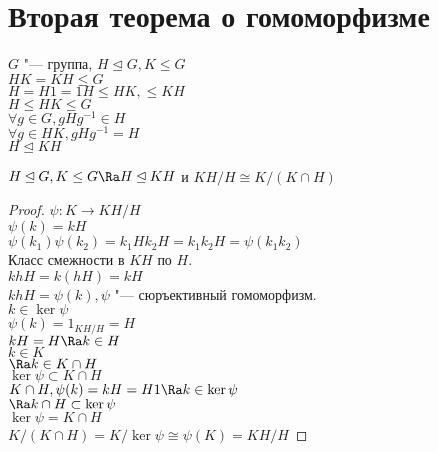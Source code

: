 ﻿\section{Вторая теорема о гомоморфизме}
$G$ "--- группа, $H \unlhd G, K \le G$\\
$HK = KH \le G$\\
$H = H1 = 1H \le HK, \le KH$\\

$H \le HK \le G$\\
$\forall g \in G, gHg^{-1} \in H$\\
$\forall g \in HK, gHg^{-1} = H$\\
$H \unlhd KH$\\
\begin{theorem}
$H \unlhd G, K \le G \Ra H \unlhd KH$ и $KH/H \cong K/(K \cap H)$\\
\end{theorem}
\begin{proof}
$\psi \colon K \to KH/H$\\
$\psi(k) = kH$\\
$\psi(k_1)\psi(k_2) = k_1Hk_2H = k_1k_2H = \psi(k_1k_2)$\\

Класс смежности в $KH$ по $H$.\\
$khH = k(hH) = kH$\\
$khH = \psi(k), \psi$ "--- сюръективный гомоморфизм.\\

$k \in \ker \psi$\\
$\psi(k) = 1_{KH/H} = H$\\
$kH = H \Ra k \in H$\\
$k \in K$\\
$\Ra k \in  K \cap H$\\

$\ker \psi \subset K \cap H$\\
$K \cap H, \psi(k) = kH = H1 \Ra k \in \ker \psi$\\
$\Ra k \cap H \subset \ker \psi$\\
$\ker \psi = K \cap H$\\

$K/(K \cap H) = K/\ker \psi \cong \psi(K) = KH/H$
\end{proof}

